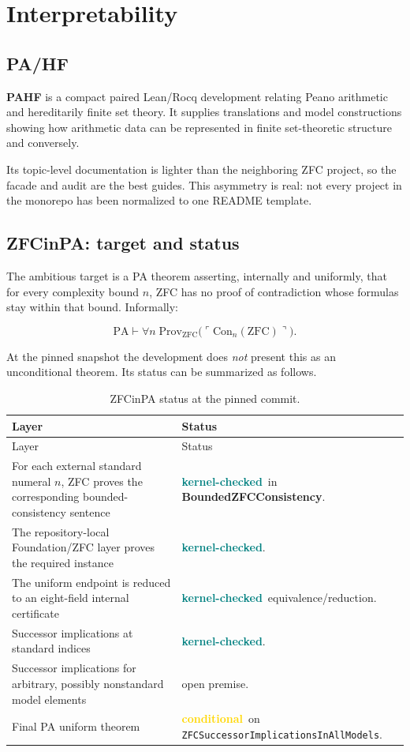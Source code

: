 \documentclass[
  10pt,
  a4paper,
  twoside,
  open=any,
  parskip=half,
  headings=big
]{scrreprt}
\newcommand{\bcode}[1]{{\ttfamily\footnotesize\nolinkurl{#1}}}
\newcommand{\project}[1]{\textsf{\bfseries #1}}
\newcommand{\conditional}{\textcolor{gold}{\textbf{conditional}}}
\newcommand{\kernelchecked}{\textcolor{teal}{\textbf{kernel-checked}}}
\begin{document}
\section{Interpretability}
\label{sec:interpretability}

\subsection{PA/HF}

\project{PAHF} is a compact paired Lean/Rocq development relating Peano
arithmetic and hereditarily finite set theory.  It supplies translations and
model constructions showing how arithmetic data can be represented in finite
set-theoretic structure and conversely.

Its topic-level documentation is lighter than the neighboring ZFC project, so
the facade and audit are the best guides.  This asymmetry is real: not every
project in the monorepo has been normalized to one README template.

\subsection{ZFCinPA: target and status}

The ambitious target is a PA theorem asserting, internally and uniformly,
that for every complexity bound \(n\), ZFC has no proof of contradiction whose
formulas stay within that bound.  Informally:

\[
  \mathrm{PA}\vdash
  \forall n\;
  \mathrm{Prov}_{\mathrm{ZFC}}\bigl(\ulcorner
    \mathrm{Con}_{n}(\mathrm{ZFC})\urcorner\bigr).
\]

At the pinned snapshot the development does \emph{not} present this as an
unconditional theorem.  Its status can be summarized as follows.

\begin{longtable}{L{.46\textwidth}L{.35\textwidth}}
\caption{ZFCinPA status at the pinned commit.}
\label{tab:zfcinpa-status}\\
\toprule
Layer & Status \\
\midrule
\endfirsthead
\toprule
Layer & Status \\
\midrule
\endhead
For each external standard numeral \(n\), ZFC proves the corresponding
bounded-consistency sentence &
\kernelchecked\ in \project{BoundedZFCConsistency}.\\
The repository-local Foundation/ZFC layer proves the required instance &
\kernelchecked.\\
The uniform endpoint is reduced to an eight-field internal certificate &
\kernelchecked\ equivalence/reduction.\\
Successor implications at standard indices &
\kernelchecked.\\
Successor implications for arbitrary, possibly nonstandard model elements &
open premise.\\
Final PA uniform theorem &
\conditional\ on \bcode{ZFCSuccessorImplicationsInAllModels}.\\
\bottomrule
\end{longtable}
\end{document}
